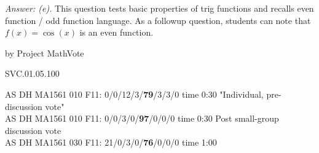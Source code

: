 {\it Answer: (e).} This question tests basic properties of trig functions and recalls even function / odd function language.  As a followup question, students can note that $f(x) = \cos(x)$ is an even function.

\medskip
by Project MathVote

SVC.01.05.100

AS DH MA1561 010 F11: 0/0/12/3/{\bf79}/3/3/0 time 0:30 "Individual, pre-discussion vote" \\
AS DH MA1561 010 F11: 0/0/3/0/{\bf97}/0/0/0 time 0:30 Post small-group discussion vote \\
AS DH MA1561 030 F11: 21/0/3/0/{\bf76}/0/0/0 time 1:00  \\
